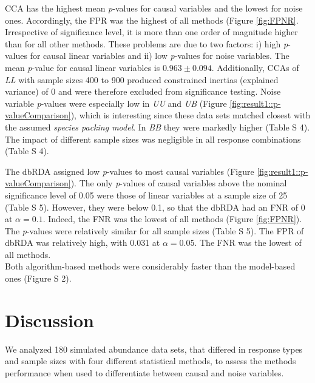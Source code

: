 \documentclass[a4paper,11pt]{article}
\begin{document}

		CCA has the highest mean \textit{p}-values for causal variables and the lowest for noise ones. 
		Accordingly, the FPR was the highest of all methods (Figure \ref{fig:FPNR}.
		Irrespective of significance level, it is more than one order of magnitude higher than for all other methods.
		These problems are due to two factors: i) high \textit{p}-values for causal linear variables and ii) low \textit{p}-values for noise variables. 
		The mean \textit{p}-value for causal linear variables is $0.963\pm0.094$. 
        Additionally, CCAs of \textit{LL} with sample sizes 400 to 900 produced constrained inertias (explained variance) of 0 and were therefore excluded from significance testing. 
		Noise variable \textit{p}-values were especially low in \textit{UU} and \textit{UB} (Figure \ref{fig:result1::p-valueComparison}), which is interesting since these data sets matched closest with the assumed \textit{species packing model}.  
		In \textit{BB} they were markedly higher (Table S 4). 
        The impact of different sample sizes was negligible in all response combinations (Table S 4).   


		The dbRDA assigned low \textit{p}-values to most causal variables (Figure \ref{fig:result1::p-valueComparison}).
		The only \textit{p}-values of causal variables above the nominal significance level of 0.05 were those of linear variables at a sample size of 25 (Table S 5).
		However, they were below 0.1, so that the dbRDA had an FNR of 0 at $\alpha = 0.1$.  
		Indeed, the FNR was the lowest of all methods (Figure \ref{fig:FPNR}).
        The \textit{p}-values were relatively similar for all sample sizes (Table S 5). 
        The FPR of dbRDA was relatively high, with 0.031 at $\alpha = 0.05$.  
        The FNR was the lowest of all methods. \\
        Both algorithm-based methods were considerably faster than the model-based ones (Figure S 2).

\section{Discussion}
	We analyzed 180 simulated abundance data sets, that differed in response types and sample sizes with four different statistical methods, to assess the methods performance when used to differentiate between causal and noise variables. 
	
\end{document}
